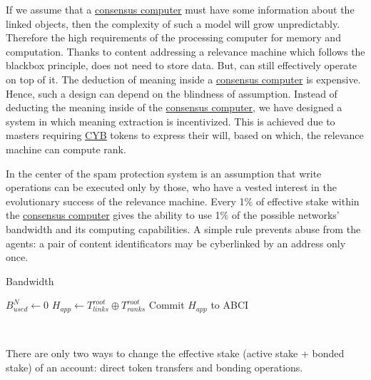 \documentclass[8pt,oneside]{amsart}
\begin{document}
If we assume that a {\hyperref[consensus-computer]{consensus computer}} must have some information about the linked objects, then the complexity of such a model will grow unpredictably. Therefore the high requirements of the processing computer for memory and computation. Thanks to content addressing a relevance machine which follows the blackbox principle, does not need to store data. But, can still effectively operate on top of it. The deduction of meaning inside a {\hyperref[consensus-computer]{consensus computer}} is expensive. Hence, such a design can depend on the blindness of assumption. Instead of deducting the meaning inside of the {\hyperref[consensus-computer]{consensus computer}}, we have designed a system in which meaning extraction is incentivized. This is achieved due to masters requiring {\hyperref[cyb]{CYB}} tokens to express their will, based on which, the relevance machine can compute rank.

In the center of the spam protection system is an assumption that write operations can be executed only by those, who have a vested interest in the evolutionary success of the relevance machine. Every 1\% of effective stake within the {\hyperref[consensus-computer]{consensus computer}} gives the ability to use 1\% of the possible networks' bandwidth and its computing capabilities. A simple rule prevents abuse from the agents: a pair of content identificators may be cyberlinked by an address only once.

\begin{algorithm}
\caption{Bandwidth}\label{bandwidth-algo}
$B^{N}_{used} \leftarrow 0$\;
\BlankLine
$H_{app} \leftarrow T^{root}_{links} \oplus T^{root}_{ranks}$\;
Commit $H_{app}$ to ABCI\;
\end{algorithm}\

There are only two ways to change the effective stake (active stake + bonded stake) of an account: direct token transfers and bonding operations.
\end{document}
